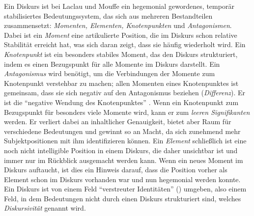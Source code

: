 \documentclass[12pt, titlepage=true, toc=bib]{scrartcl}
\begin{document}
{%

Ein Diskurs ist bei Laclau und Mouffe ein hegemonial gewordenes, temporär stabilisiertes Bedeutungssystem, das sich aus mehreren Bestandteilen zusammensetzt: \textit{Momenten, Elementen, Knotenpunkten} und \textit{Antagonismen}. Dabei ist ein \textit{Moment} eine artikulierte Position, die im Diskurs schon relative Stabilität erreicht hat, was sich daran zeigt, dass sie häufig wiederholt wird. Ein \textit{Knotenpunkt} ist ein besonders stabiles Moment, das den Diskurs strukturiert, indem es einen Bezugspunkt für alle Momente im Diskurs darstellt. Ein \textit{Antagonismus} wird benötigt, um die Verbindungen der Momente zum Knotenpunkt verstehbar zu machen; allen Momenten eines Knotenpunktes ist gemeinsam, dass sie sich negativ auf den Antagonismus beziehen (\textit{Differenz}). Er ist die "`negative Wendung des Knotenpunktes"' \cite[6]{bruell_chancen_2006}. Wenn ein Knotenpunkt zum Bezugspunkt für besonders viele Momente wird, kann er zum \textit{leeren Signifikanten} werden. Er verliert dabei an inhaltlicher Genauigkeit, bietet aber Raum für verschiedene Bedeutungen und gewinnt so an Macht, da sich zunehmend mehr Subjektpositionen mit ihm identifizieren können. Ein \textit{Element} schließlich ist eine noch nicht intelligible Position in einem Diskurs, die daher unsichtbar ist und immer nur im Rückblick ausgemacht werden kann. Wenn ein neues Moment im Diskurs auftaucht, ist dies ein Hinweis darauf, dass die Position vorher als Element schon im Diskurs vorhanden war und nun hegemonial werden konnte. Ein Diskurs ist von einem Feld "`verstreuter Identitäten"' (\cite[vgl.][6]{bruell_chancen_2006}) umgeben, also einem Feld, in dem Bedeutungen nicht durch einen Diskurs strukturiert sind, welches \textit{Diskursivität} genannt wird. 

}
\end{document}
